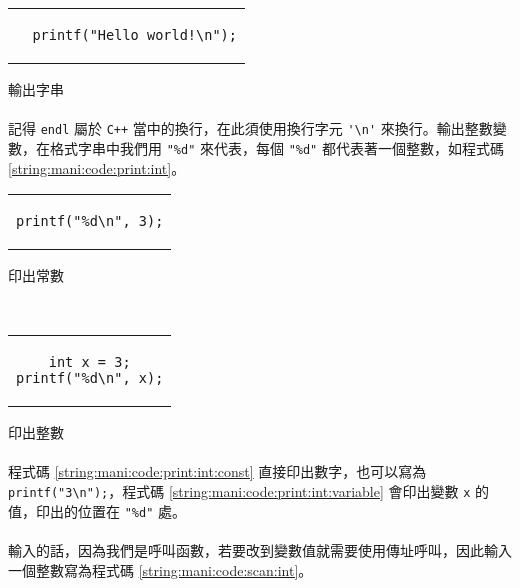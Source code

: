 \documentclass[12pt,a4paper,oneside]{report}
\begin{document}
\begin{CJK}{UTF8}{bkai}
\begin{code}[h!]
  \centering
  \begin{tabular}{c}
  \begin{lstlisting}
  printf("Hello world!\n");
  \end{lstlisting}
  \end{tabular}
  \caption{輸出字串}
  \label{string:mani:code:printf:string}
\end{code}

\paragraph{}記得 \lstinline!endl! 屬於 \texttt{C++} 當中的換行，在此須使用換行字元 \lstinline!'\n'! 來換行。輸出整數變數，在格式字串中我們用 \lstinline!"%d"! 來代表，每個 \lstinline!"%d"! 都代表著一個整數，如程式碼 \ref{string:mani:code:print:int}。

\begin{code}[h!]
  \centering
  \begin{subcode}{.33\textwidth}
    \centering
    \begin{tabular}{c}
    \begin{lstlisting}
printf("%d\n", 3);
    \end{lstlisting}
    \end{tabular}
    \caption{印出常數}
    \label{string:mani:code:print:int:const}
  \end{subcode}
  ~
  \begin{subcode}{.33\textwidth}
    \centering
    \begin{tabular}{c}
    \begin{lstlisting}
int x = 3;
printf("%d\n", x);
    \end{lstlisting}
    \end{tabular}
    \caption{印出 \lstinline!int! 變數}
    \label{string:mani:code:print:int:variable}
  \end{subcode}
  \caption{印出整數}
  \label{string:mani:code:print:int}
\end{code}

\paragraph{}程式碼 \ref{string:mani:code:print:int:const} 直接印出數字，也可以寫為 \lstinline!printf("3\n");!，程式碼 \ref{string:mani:code:print:int:variable} 會印出變數 \lstinline!x! 的值，印出的位置在 \lstinline!"%d"! 處。
\paragraph{}輸入的話，因為我們是呼叫函數，若要改到變數值就需要使用傳址呼叫，因此輸入一個整數寫為程式碼 \ref{string:mani:code:scan:int}。


\end{CJK}
\end{document}
